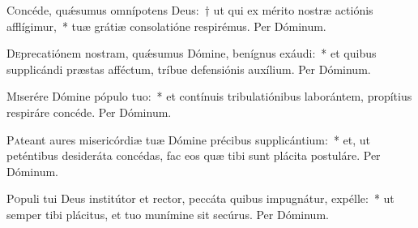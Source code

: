 \documentclass[vesperale_romanum.tex]{subfiles}
\begin{document}

\oratio

\lettrine{C}{o}ncéde, quǽsumus omnípotens Deus:~† ut qui ex mérito nostræ actiónis afflígimur,~* tuæ grátiæ consolatióne respirémus.
Per Dóminum.






\oratio

\lettrine{D}{e}precatiónem nostram, quǽsumus Dómine, benígnus exáudi:~* et quibus supplicándi præstas affé\-ctum, tríbue defensiónis auxílium. Per Dóminum.



\oratio

\lettrine{M}{i}serére Dómine pópulo tuo:~* et contínuis tribulatiónibus laborántem, propítius respiráre concéde. Per Dóminum.



\oratio

\lettrine{P}{a}teant aures misericórdiæ tuæ Dómine précibus supplicántium:~* et, ut peténtibus desideráta concédas, fac eos quæ tibi sunt plácita postuláre.
Per Dóminum.



\oratio

\lettrine{P}{o}puli tui Deus institútor et rector, peccáta quibus impugnátur, expélle:~* ut semper tibi plácitus, et tuo munímine sit secúrus. Per Dóminum.


\end{document}
